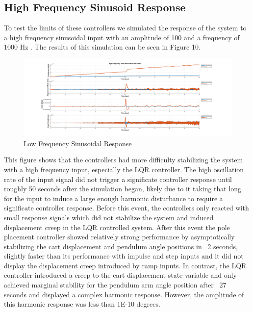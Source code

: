 \documentclass[titlepage]{article}
\begin{document}
\subsection{High Frequency Sinusoid Response}

To test the limits of these controllers we simulated the response of the system to a high frequency sinusoidal input with an amplitude of 100  and a frequency of 1000 Hz . The results of this simulation can be seen in Figure 10.

\begin{figure}[h]
    \includegraphics[width=1\linewidth]{high_freq_sine.png}
    \caption{Low Frequency Sinusoidal Response}
    \label{fig:enter-label}
\end{figure}

This figure shows that the controllers had more difficulty stabilizing the system with a high frequency input, especially the LQR controller. The high oscillation rate of the input signal did not trigger a significate controller response until roughly 50 seconds after the simulation began, likely due to it taking that long for the input to induce a large enough harmonic disturbance to require a significate controller response.  Before this event, the controllers only reacted with small response signals which did not stabilize the system and induced displacement creep in the LQR controlled system. After this event the pole placement controller showed relatively strong performance by asymptotically stabilizing the cart displacement and pendulum angle positions in ~2 seconds, slightly faster than its performance with impulse and step inputs and it did not display the displacement creep introduced by ramp inputs. In contrast, the LQR controller introduced a creep to the cart displacement state variable and only achieved marginal stability for the pendulum arm angle position after ~27 seconds  and displayed a complex harmonic  response. However, the amplitude of this harmonic response was less than 1E-10 degrees.\\
\end{document}
